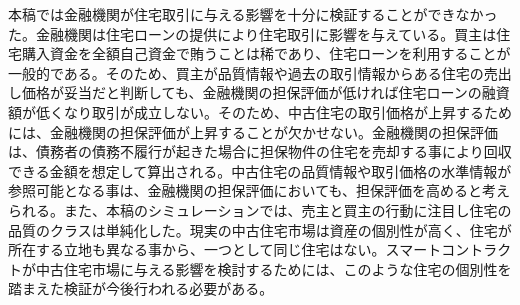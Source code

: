 \documentclass[a4paper,fontsize=11pt,report,notitlepage,line_length=38zw,number_of_lines=40,dvipdfmx]{jlreq}
\begin{document}
本稿では金融機関が住宅取引に与える影響を十分に検証することができなかった。金融機関は住宅ローンの提供により住宅取引に影響を与えている。買主は住宅購入資金を全額自己資金で賄うことは稀であり、住宅ローンを利用することが一般的である。そのため、買主が品質情報や過去の取引情報からある住宅の売出し価格が妥当だと判断しても、金融機関の担保評価が低ければ住宅ローンの融資額が低くなり取引が成立しない。そのため、中古住宅の取引価格が上昇するためには、金融機関の担保評価が上昇することが欠かせない。金融機関の担保評価は、債務者の債務不履行が起きた場合に担保物件の住宅を売却する事により回収できる金額を想定して算出される。中古住宅の品質情報や取引価格の水準情報が参照可能となる事は、金融機関の担保評価においても、担保評価を高めると考えられる。また、本稿のシミュレーションでは、売主と買主の行動に注目し住宅の品質のクラスは単純化した。現実の中古住宅市場は資産の個別性が高く、住宅が所在する立地も異なる事から、一つとして同じ住宅はない。スマートコントラクトが中古住宅市場に与える影響を検討するためには、このような住宅の個別性を踏まえた検証が今後行われる必要がある。




\end{document}
